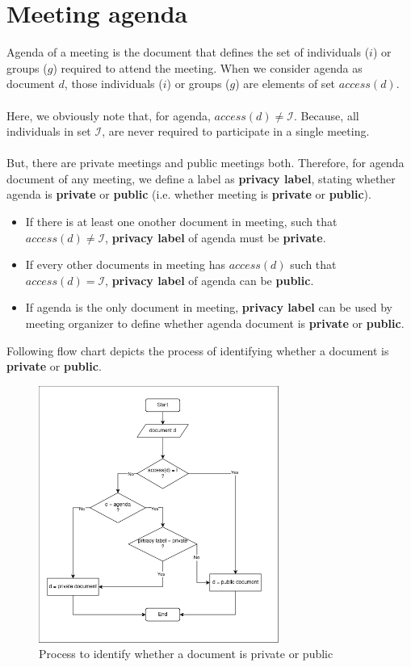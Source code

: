 \documentclass{article}
\begin{document}
\section{Meeting agenda}
\noindent
Agenda of a meeting is the document that defines the set of individuals ($i$) or groups ($g$) required to attend the meeting.
When we consider agenda as document $d$, those individuals ($i$) or groups ($g$) are elements of set $access(d)$.\\ \\
Here, we obviously note that, for agenda, $access(d) \ne \mathcal{I}$. Because, all individuals in set $\mathcal{I}$, are never required to participate in a single meeting.\\ \\
But, there are private meetings and public meetings both. Therefore, for agenda document of any meeting, we define a label as \textbf{privacy label}, stating whether agenda is \textbf{private} or \textbf{public} (i.e. whether meeting is \textbf{private} or \textbf{public}).
\begin{itemize}
    \item If there is at least one onother document in meeting, such that $access(d) \ne \mathcal{I}$, \textbf{privacy label} of agenda must be \textbf{private}.
    \item If every other documents in meeting has $access(d)$ such that $access(d) = \mathcal{I}$, \textbf{privacy label} of agenda can be \textbf{public}.
    \item If agenda is the only document in meeting, \textbf{privacy label} can be used by meeting organizer to define whether agenda document is \textbf{private} or \textbf{public}.
\end{itemize}

\noindent
Following flow chart depicts the process of identifying whether a document is \textbf{private} or \textbf{public}.
\begin{figure}[H]
    \centering
    \includegraphics[width=0.7\textwidth]{./image/document_Aug_22.png}
    \caption{Process to identify whether a document is private or public}
    \label{fig:sample}
\end{figure} 
\end{document}
